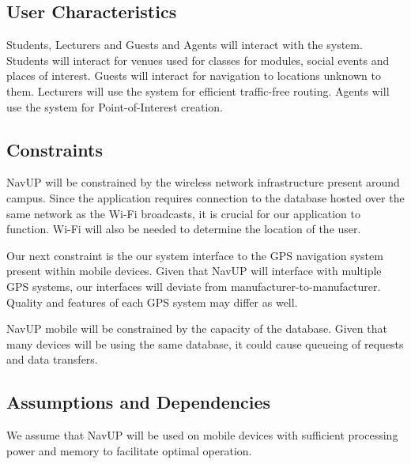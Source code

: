 \documentclass{article}
\begin{document}
    \subsection{User Characteristics}
        \begin{flushleft}
            Students, Lecturers and Guests and Agents will interact with the system.
            \break
            Students will interact for venues used for classes for modules, social events and places of interest.
            Guests will interact for navigation to locations unknown to them.
            Lecturers will use the system for efficient traffic-free routing.
            Agents will use the system for Point-of-Interest creation.
        \end{flushleft}
    \subsection{Constraints}
        \begin{flushleft}
        NavUP will be constrained by the wireless network infrastructure present around campus. Since the application requires connection to the database hosted over the same network as the Wi-Fi broadcasts, it is crucial for our application to function. Wi-Fi will also be needed to determine the location of the user.
        \end{flushleft}
        
        \begin{flushleft}
        Our next constraint is the our system interface to the GPS navigation system present within mobile devices. Given that NavUP will interface with multiple GPS systems, our interfaces will deviate from manufacturer-to-manufacturer. Quality and features of each GPS system may differ as well.
        \end{flushleft}
        
        \begin{flushleft}
        NavUP mobile will be constrained by the capacity of the database. Given that many devices will be using the same database, it could cause queueing of requests and data transfers.
        \end{flushleft}
        \subsection{Assumptions and Dependencies}
        
        \begin{flushleft}
        We assume that NavUP will be used on mobile devices with sufficient processing power and memory to facilitate optimal operation.
        \end{flushleft}
        
\end{document}

